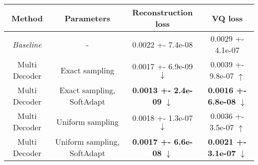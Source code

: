 \centering
\scriptsize
\begin{tabular}{||c|c|c|c||}
\hline
 Method & Parameters & Reconstruction loss & VQ loss \\
\hline
\textit{Baseline} & - & 0.0022 +- 7.4e-08 & 0.0029 +- 4.1e-07 \\
\hline
Multi Decoder & Exact sampling & 0.0017 +- 6.9e-09  $\downarrow$ & 0.0039 +- 9.8e-07  $\uparrow$ \\
\hline
Multi Decoder & Exact sampling, SoftAdapt & \textbf{0.0013 +- 2.4e-09}  $\downarrow$ & \textbf{0.0016 +- 6.8e-08}  $\downarrow$ \\
\hline
Multi Decoder & Uniform sampling & 0.0018 +- 1.3e-07  $\downarrow$ & 0.0036 +- 3.5e-07  $\uparrow$ \\
\hline
Multi Decoder & Uniform sampling, SoftAdapt & \textbf{0.0017 +- 6.6e-08}  $\downarrow$ & \textbf{0.0021 +- 3.1e-07}  $\downarrow$ \\
\hline
\end{tabular}
